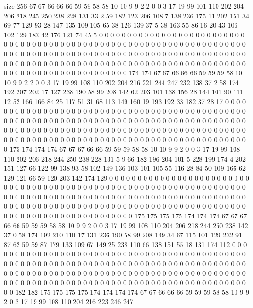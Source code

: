 size 256
67 67 66 66 66 59 59 58 58 10 10 9 9 2 2 0 0 3 17 19
99 101 110 202 204 206 218 245 250 238 228 131 33 2 59 182 123 206 108 7
138 236 175 11 202 151 34 69 77 129 93 28 147 135 109 105 65 38 126 139
37 5 38 163 55 86 16 20 43 106 102 129 183 42 176 121 74 45 5 0
0 0 0 0 0 0 0 0 0 0 0 0 0 0 0 0 0 0 0 0
0 0 0 0 0 0 0 0 0 0 0 0 0 0 0 0 0 0 0 0
0 0 0 0 0 0 0 0 0 0 0 0 0 0 0 0 0 0 0 0
0 0 0 0 0 0 0 0 0 0 0 0 0 0 0 0 0 0 0 0
0 0 0 0 0 0 0 0 0 0 0 0 0 0 0 0 0 0 0 0
0 0 0 0 0 0 0 0 0 0 0 0 0 0 0 0 0 0 0 0
0 0 0 0 0 0 0 0 0 0 0 0 0 0 0 0 0 0 0 0
0 0 0 0 0 0 0 0 0 0 0 0 0 0 0 0 0 0 0 0
0 0 0 0 0 0 0 0 0 0 0 0 0 0 0 0 174 174 67 67
66 66 66 59 59 59 58 10 10 9 9 2 2 0 0 3 17 19 99 108
110 202 204 216 221 244 247 232 138 37 2 58 174 192 207 202 17 127 238 190
58 99 208 142 62 203 101 138 156 28 144 101 90 111 12 52 166 166 84 25
117 51 31 68 113 149 160 19 193 192 33 182 37 28 17 0 0 0 0 0
0 0 0 0 0 0 0 0 0 0 0 0 0 0 0 0 0 0 0 0
0 0 0 0 0 0 0 0 0 0 0 0 0 0 0 0 0 0 0 0
0 0 0 0 0 0 0 0 0 0 0 0 0 0 0 0 0 0 0 0
0 0 0 0 0 0 0 0 0 0 0 0 0 0 0 0 0 0 0 0
0 0 0 0 0 0 0 0 0 0 0 0 0 0 0 0 0 0 0 0
0 0 0 0 0 0 0 0 0 0 0 0 0 0 0 0 0 0 0 0
0 0 0 0 0 0 0 0 0 0 0 0 0 0 0 0 0 0 0 0
0 0 0 0 0 0 0 0 0 0 0 0 0 0 0 0 0 0 0 0
0 0 0 0 0 0 0 0 0 0 0 0 175 174 174 174 67 67 67 66
66 59 59 59 58 58 10 10 9 9 2 0 0 3 17 19 99 108 110 202
206 218 244 250 238 228 131 5 9 66 182 196 204 101 5 228 199 174 4 202
151 127 66 122 99 138 93 58 102 149 136 103 101 105 55 116 28 84 50 109
166 62 129 121 66 59 120 203 142 174 129 0 0 0 0 0 0 0 0 0
0 0 0 0 0 0 0 0 0 0 0 0 0 0 0 0 0 0 0 0
0 0 0 0 0 0 0 0 0 0 0 0 0 0 0 0 0 0 0 0
0 0 0 0 0 0 0 0 0 0 0 0 0 0 0 0 0 0 0 0
0 0 0 0 0 0 0 0 0 0 0 0 0 0 0 0 0 0 0 0
0 0 0 0 0 0 0 0 0 0 0 0 0 0 0 0 0 0 0 0
0 0 0 0 0 0 0 0 0 0 0 0 0 0 0 0 0 0 0 0
0 0 0 0 0 0 0 0 0 0 0 0 0 0 0 0 0 0 0 0
0 0 0 0 0 0 0 0 0 0 0 0 0 0 0 0 0 0 0 0
0 0 0 0 0 0 0 0 175 175 175 175 174 174 174 67 67 67 66 66
59 59 59 58 58 10 9 9 2 0 0 3 17 19 99 108 110 204 206 218
244 250 238 142 37 0 58 174 192 210 110 17 131 236 190 58 99 208 149 34
67 115 101 129 232 91 87 62 59 59 87 179 133 109 67 149 25 238 110 66
138 151 55 18 131 174 112 0 0 0 0 0 0 0 0 0 0 0 0 0
0 0 0 0 0 0 0 0 0 0 0 0 0 0 0 0 0 0 0 0
0 0 0 0 0 0 0 0 0 0 0 0 0 0 0 0 0 0 0 0
0 0 0 0 0 0 0 0 0 0 0 0 0 0 0 0 0 0 0 0
0 0 0 0 0 0 0 0 0 0 0 0 0 0 0 0 0 0 0 0
0 0 0 0 0 0 0 0 0 0 0 0 0 0 0 0 0 0 0 0
0 0 0 0 0 0 0 0 0 0 0 0 0 0 0 0 0 0 0 0
0 0 0 0 0 0 0 0 0 0 0 0 0 0 0 0 0 0 0 0
0 0 0 0 0 0 0 0 0 0 0 0 0 0 0 0 0 0 0 0
0 0 0 0 182 182 175 175 175 175 174 174 174 174 67 67 66 66 66 59
59 59 58 58 10 9 9 2 0 3 17 19 99 108 110 204 216 223 246 247
